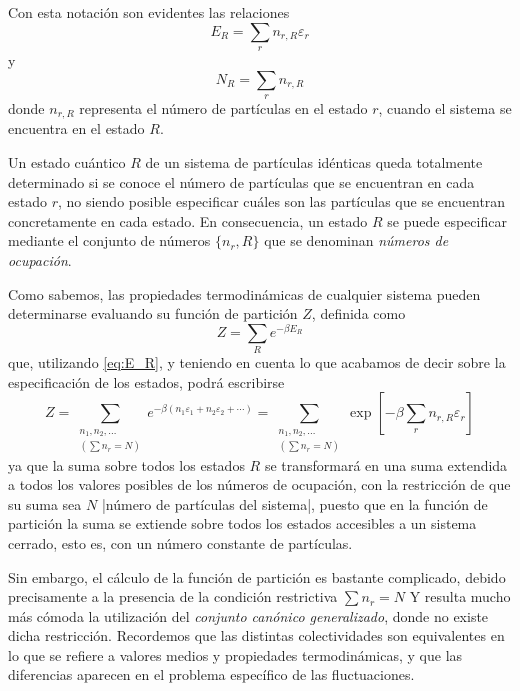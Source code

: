 Con esta notación son evidentes las relaciones
\begin{equation} \label{eq:E_R}
	E_R = \sum_r n_{r,R} \varepsilon_r
\end{equation}
y
\begin{equation}\label{eq:N_R}
	N_R = \sum_r n_{r,R}
\end{equation}
donde $n_{r,R}$ representa el número de partículas en el estado $r$, cuando el sistema se encuentra en el estado $R$.

Un estado cuántico $R$ de un sistema de partículas idénticas queda totalmente determinado si se conoce el número de partículas que se encuentran en cada estado $r$, no siendo posible especificar cuáles son las partículas que se encuentran concretamente en cada estado.
En consecuencia, un estado $R$ se puede especificar mediante el conjunto de números $\{n_r,R\}$ que se denominan \emph{números de ocupación}.

Como sabemos, las propiedades termodinámicas de cualquier sistema pueden determinarse evaluando su función de partición $Z$, definida como
\begin{equation}
	Z = \sum_R e^{-\beta E_R}
\end{equation}
que, utilizando \eqref{eq:E_R}, y teniendo en cuenta lo que acabamos de decir sobre la especificación de los estados, podrá escribirse
\begin{equation}\label{eq:Z_cuant}
	Z = \sum_{\substack{n_1, n_2, \ldots\\(\sum n_r =N)}} e^{-\beta (n_1 \varepsilon_1 + n_2 \varepsilon_2 + \cdots)} = \sum_{\substack{n_1, n_2, \ldots\\(\sum n_r =N)}} \exp \left[ -\beta \sum_r n_{r,R} \varepsilon_r \right] 
\end{equation}
ya que la suma sobre todos los estados $R$ se transformará en una suma extendida a todos los valores posibles de los números de ocupación, con la restricción de que su suma sea $N$ |número de partículas del sistema|, puesto que en la función de partición la suma se extiende sobre todos los estados accesibles a un sistema cerrado, esto es, con un número constante de partículas.

Sin embargo, el cálculo de la función de partición es bastante complicado, debido precisamente a la presencia de la condición restrictiva $\sum n_r =N$ Y resulta mucho más cómoda la utilización del \emph{conjunto canónico generalizado}, donde no existe dicha restricción.
Recordemos que las distintas colectividades son equivalentes en lo que se refiere a valores medios y propiedades termodinámicas, y que las diferencias aparecen en el problema específico de las fluctuaciones.

